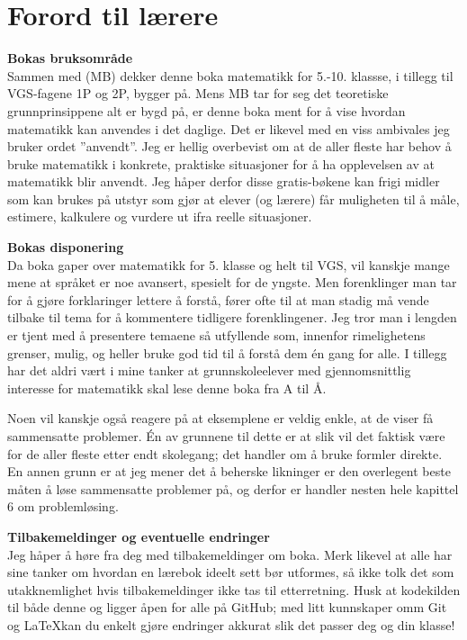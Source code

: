 


\newpage
\section*{Forord til lærere}
\textbf{Bokas bruksområde}\\
Sammen med  (MB) dekker denne boka matematikk for 5.-10. klassse, i tillegg til VGS-fagene 1P og 2P, bygger på. Mens MB tar for seg det teoretiske grunnprinsippene alt er bygd på, er denne boka ment for å vise hvordan matematikk kan anvendes i det daglige. Det er likevel med en viss ambivales jeg bruker ordet ''anvendt''. Jeg er hellig overbevist om at de aller fleste har behov å bruke matematikk i konkrete, praktiske situasjoner for å ha opplevelsen av at matematikk blir anvendt. Jeg håper derfor disse gratis-bøkene kan frigi midler som kan brukes på utstyr som gjør at elever (og lærere) får muligheten til å måle, estimere, kalkulere og vurdere ut ifra reelle situasjoner.\vsk

\textbf{Bokas disponering} \\
Da boka gaper over matematikk for 5. klasse og helt til VGS, vil kanskje mange mene at språket er noe avansert, spesielt for de yngste. Men forenklinger man tar for å gjøre forklaringer lettere å forstå, fører ofte til at man stadig må vende tilbake til tema for å kommentere tidligere forenklingener. Jeg tror man i lengden er tjent med å presentere temaene så utfyllende som, innenfor rimelighetens grenser, mulig, og heller bruke god tid til å forstå dem én gang for alle. I tillegg har det aldri vært i mine tanker at grunnskoleelever med gjennomsnittlig interesse for matematikk skal lese denne boka fra A til Å. \vsk

Noen vil kanskje også reagere på at eksemplene er veldig enkle, at de viser få sammensatte problemer. Én av grunnene til dette er at slik vil det faktisk være for de aller fleste etter endt skolegang; det handler om å bruke formler direkte. En annen grunn er at jeg mener det å beherske likninger er den overlegent beste måten å løse sammensatte problemer på, og derfor er handler nesten hele kapittel 6 om problemløsing.\vsk

\textbf{Tilbakemeldinger og eventuelle endringer} \\
Jeg håper å høre fra deg med tilbakemeldinger om boka. Merk likevel at alle har sine tanker om hvordan en lærebok ideelt sett bør utformes, så ikke tolk det som utakknemlighet hvis tilbakemeldinger ikke tas til etterretning. Husk at kodekilden til både denne  og \mb\;ligger åpen for alle på GitHub; med litt kunnskaper omm Git og \LaTeX kan du enkelt gjøre endringer akkurat slik det passer deg og din klasse!


